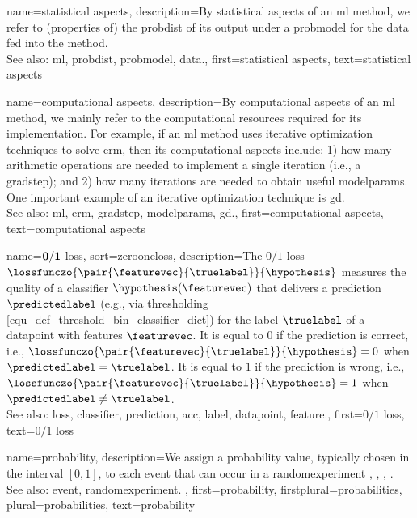 {name={statistical aspects}, 
	description={By statistical aspects 
		of an \gls{ml} method, we refer to (properties of) the \gls{probdist} of its output 
		under a \gls{probmodel} for the \gls{data} fed into the method.
					\\ 
		See also: \gls{ml}, \gls{probdist}, \gls{probmodel}, \gls{data}.},
	first={statistical aspects},
	text={statistical aspects}
}

{name={computational aspects}, 
	description={By computational 
		aspects of an \gls{ml} method, we mainly refer to the computational 
		resources required for its implementation. For example, if an \gls{ml} method uses iterative 
		optimization techniques to solve \gls{erm}, then its computational aspects include: 1) how 
		many arithmetic operations are needed to implement a single iteration (i.e., a \gls{gradstep}); 
		and 2) how many iterations are needed to obtain useful \glspl{modelparam}. One important 
		example of an iterative optimization technique is \gls{gd}.
					\\ 
		See also: \gls{ml}, \gls{erm}, \gls{gradstep}, \glspl{modelparam}, \gls{gd}.}, 
	first={computational aspects},
	text={computational aspects}
}

{name={$\bf 0/1$ loss},
sort={zerooneloss}, 
	description={The $0/1$ \gls{loss} $\lossfunczo{\pair{\featurevec}{\truelabel}}{\hypothesis}$ 
		measures the quality of a \gls{classifier} $\hypothesis(\featurevec)$ that delivers a 
		\gls{prediction} $\predictedlabel$ (e.g., via thresholding \eqref{equ_def_threshold_bin_classifier_dict}) 
		for the \gls{label} $\truelabel$ of a \gls{datapoint} with \glspl{feature} $\featurevec$. It is equal to $0$ if 
		the \gls{prediction} is correct, i.e., 
		$\lossfunczo{\pair{\featurevec}{\truelabel}}{\hypothesis}=0$ when $\predictedlabel=\truelabel$. It is 
		equal to $1$ if the \gls{prediction} is wrong, i.e., $\lossfunczo{\pair{\featurevec}{\truelabel}}{\hypothesis}=1$ 
		when $\predictedlabel\neq\truelabel$.
				\\ 
		See also: \gls{loss}, \gls{classifier}, \gls{prediction}, \gls{acc}, \gls{label}, \gls{datapoint}, \gls{feature}.},
    	first={$0/1$ loss},
	text={$0/1$ loss}
}

{name={probability}, 
	description={We assign a probability value, typically chosen in the 
		interval $[0,1]$, to each \gls{event} that can occur in a \gls{randomexperiment}  
		\cite{BillingsleyProbMeasure}, \cite{BertsekasProb}, \cite{HalmosMeasure},  \cite{KallenbergBook}.
		\\
		See also: \gls{event}, \gls{randomexperiment}. },
	first={probability},
	firstplural={probabilities},
	plural={probabilities},
	text={probability}
}
	
